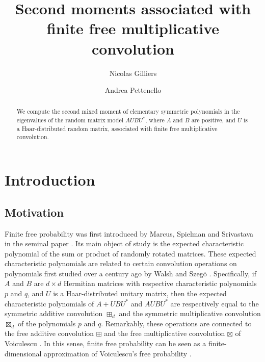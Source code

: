 \documentclass[11pt, a4paper, oneside, reqno]{amsart}
\title{Second moments associated with finite free multiplicative convolution}
\author{Nicolas Gilliers}
\author{Andrea Pettenello}
\theoremstyle{remark}
\theoremstyle{definition}
\numberwithin{equation}{section}
\begin{document}
\begin{abstract}
We compute the second mixed moment of elementary symmetric polynomials in the eigenvalues of the random matrix model $AUBU^*$, where $A$ and $B$ are positive, and $U$ is a Haar-distributed random matrix, associated with finite free multiplicative convolution.
\end{abstract}
\maketitle
 \tableofcontents

\section{Introduction}
\subsection{Motivation}
\label{sec:Intro}
Finite free probability was first introduced by Marcus, Spielman and Srivastava in the seminal paper \cite{marcus2022finite}. Its main object of study is the expected characteristic polynomial of the sum or product of randomly rotated matrices. These expected characteristic polynomials are related to certain convolution operations on polynomials first studied over a century ago by Walsh \cite{walsh1922location} and Szeg\"{o} \cite{szego1922bemerkungen}. Specifically, if $A$ and $B$ are $d \times d$ Hermitian matrices with respective characteristic polynomials $p$ and $q$, and $U$ is a Haar-distributed unitary matrix, then the expected characteristic polynomials of $A+UBU^*$ and $AUBU^*$ are respectively equal to the symmetric additive convolution $\boxplus_d$ and the symmetric multiplicative convolution $\boxtimes_d$ of the polynomials $p$ and $q$. Remarkably, these operations are connected to the free additive convolution $\boxplus$ and the free multiplicative convolution $\boxtimes$ of Voiculescu \cite{voiculescu1991limit}. In this sense, finite free probability can be seen as a finite-dimensional approximation of Voiculescu's free probability \cite{voiculescu1986addition, voiculescu1987multiplication}.
\par
\end{document}
